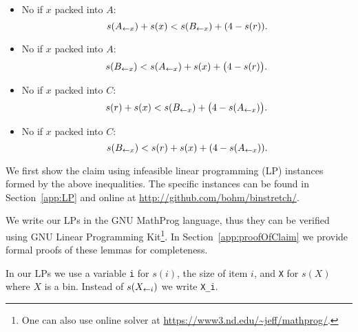 \begin{itemize}
\item No  if $x$ packed into $A$:
\begin{equation}\label{eq:8}
s(A_{\leftarrow x}) + s(x) < s(B_{\leftarrow x}) + (4 - s(r)).
\end{equation}

\item No  if $x$ packed into $A$:
\begin{equation}\label{eq:8b}
s(B_{\leftarrow x}) < s(A_{\leftarrow x}) + s(x) + \big(4 - s(r)\big).
\end{equation}

\item No  if $x$ packed into $C$:
\begin{equation}\label{eq:9b}
s(r) + s(x) < s(B_{\leftarrow x}) + \big(4 - s(A_{\leftarrow x})\big).
\end{equation}

\item No  if $x$ packed into $C$:
\begin{equation}\label{eq:9}
s(B_{\leftarrow x}) < s(r) + s(x) + (4 - s(A_{\leftarrow x})). 
\end{equation}
\end{itemize}

\setlength{\abovedisplayskip}{\ads}
\setlength{\belowdisplayskip}{\bds}
\goodbreak

We first show the claim using infeasible linear programming (LP)
instances formed by the above inequalities.  The specific instances
can be found in Section~\ref{app:LP} and online at \url{http://github.com/bohm/binstretch/}.

We write our LPs in the GNU MathProg language, thus they can be
verified using GNU Linear Programming Kit\footnote{One can also use
online solver at \url{https://www3.nd.edu/~jeff/mathprog/}.}.  In
Section~\ref{app:proofOfClaim} we provide formal proofs of these
lemmas for completeness.

In our LPs we use a variable \texttt{i} for $s(i)$, the size of item $i$,
and \texttt{X} for $s(X)$ where $X$ is a bin. Instead of $s(X_{\leftarrow i})$
we write \texttt{X\_i}.

